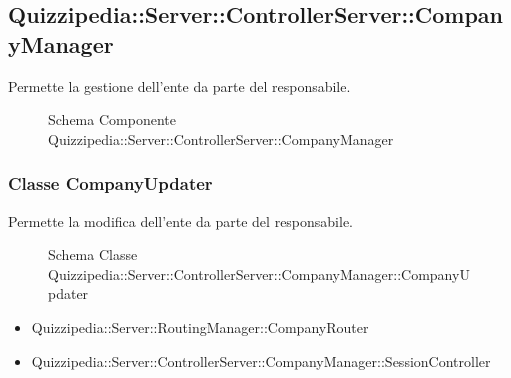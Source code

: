 \subsection{Quizzipedia::Server::ControllerServer::CompanyManager}
Permette la gestione dell'ente da parte del responsabile.
\begin{figure}[H]
\centering
\noindent{}
\caption[Quizzipedia::Server::ControllerServer::CompanyManager]{Schema Componente Quizzipedia::Server::ControllerServer::CompanyManager}
\end{figure}
\subsubsection{Classe CompanyUpdater}
Permette la modifica dell'ente da parte del responsabile.
\begin{figure}[H]
\centering
\noindent{}
\caption{Schema Classe Quizzipedia::Server::ControllerServer::CompanyManager::CompanyUpdater}
\end{figure}
\begin{itemize}
\item Quizzipedia::Server::RoutingManager::CompanyRouter
\end{itemize}
\begin{itemize}
\item Quizzipedia::Server::ControllerServer::CompanyManager::SessionController
\end{itemize}
